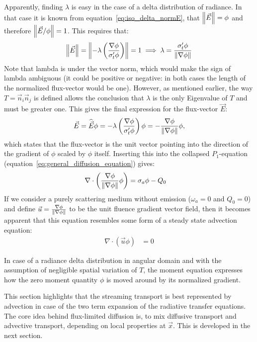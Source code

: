 Apparently, finding $\lambda$ is easy in the case of a delta distribution of radiance. In that case it is known from equation~\ref{eq:iso_delta_normE}, that $\left\lVert\vec{E}\right\rVert=\phi$ and therefore $\left\lVert\vec{E}/\phi\right\rVert=1$. This requires that:
\begin{align*}
\left\lVert\vec{E}\right\rVert
=
\left\lVert-\lambda\left(\frac{\nabla\phi}{\sigma_t'\phi}\right )\right\rVert=1
\implies
\lambda=\frac{\sigma_t'\phi}{\left\lVert\nabla\phi\right\rVert}
\end{align*}
Note that lambda is under the vector norm, which would make the sign of lambda ambiguous (it could be positive or negative: in both cases the length of the normalized flux-vector would be one). However, as mentioned earlier, the way $T=\vec{n}_i\vec{n}_j$ is defined allows the conclusion that $\lambda$ is the only Eigenvalue of $T$ and must be greater one. This gives the final expression for the flux-vector $\vec{E}$:
\begin{align*}
\vec{E}=\widehat{\vec{E}}\phi= -\lambda\left(\frac{\nabla\phi}{\sigma_t'\phi}\right )\phi= -\frac{\nabla\phi}{\left\lVert\nabla\phi\right\rVert}\phi
,
\end{align*}
which states that the flux-vector is the unit vector pointing into the direction of the gradient of $\phi$ scaled by $\phi$ itself. Inserting this into the collapsed $P_1$-equation (equation~\ref{eq:general_diffusion_equation}) gives:
\begin{align}
\label{eq:iso_delta_advection_equation}
\nabla\cdot\left(\frac{\nabla\phi}{\left\lVert\nabla\phi\right\rVert}\phi\right) &= \sigma_a\phi - Q_0
\end{align}
If we consider a purely scattering medium without emission ($\omega_a=0$ and $Q_0=0$) and define $\vec{u}=\frac{\nabla\phi}{\left\lVert\nabla\phi\right\rVert}$ to be the unit fluence gradient vector field, then it becomes apparent that this equation resembles some form of a steady state advection equation:
\begin{align}
\label{eq:iso_delta_advection_equation2}
\nabla\cdot\left(\vec{u}\phi\right) &= 0
\end{align}

In case of a radiance delta distribution in angular domain and with the assumption of negligible spatial variation of $T$, the moment equation expresses how the zero moment quantity $\phi$ is moved around by its normalized gradient.

This section highlights that the streaming transport is best represented by advection in case of the two term expansion of the radiative transfer equations. The core idea behind flux-limited diffusion is, to mix diffusive transport and advective transport, depending on local properties at $\vec{x}$. This is developed in the next section.